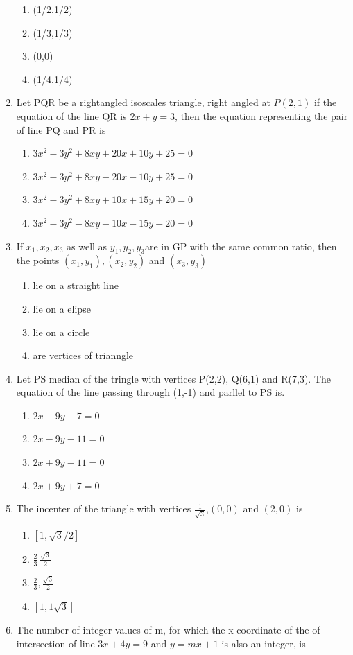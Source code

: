 \documentclass[12pt]{article}
\begin{document}
\begin{enumerate}
\begin{enumerate}
\item  (1/2,1/2) 
\item   (1/3,1/3) 
\item    (0,0)
\item   (1/4,1/4)
\end{enumerate}
\item Let PQR be a rightangled isoscales triangle, right angled at $P(2,1)$ if the equation of the line QR is $2x+y=3$, then the equation representing the pair of line PQ and PR is
\begin{enumerate}
\item $3x^2-3y^2+8xy+20x+10y+25=0$
\item   $3x^2-3y^2+8xy-20x-10y+25=0$
\item   $3x^2-3y^2+8xy+10x+15y+20=0$
\item  $3x^2-3y^2-8xy-10x-15y-20=0$
\end{enumerate}
\item If $x_1,x_2,x_3$ as well as $y_1,y_2,y_3 $are in GP with the same common ratio, then the points $(x_1,y_1),(x_2,y_2)$ and $(x_3,y_3)$
\begin{enumerate}
\item lie on a straight line 
\item lie on a elipse 
\item lie on a circle  
\item  are vertices of trianngle 
\end{enumerate}
\item Let PS median of the tringle with vertices P(2,2), Q(6,1) and R(7,3). The equation of the line passing through (1,-1) and parllel to PS is.
\begin{enumerate}
\item $2x-9y-7=0$ 
\item   $2x-9y-11=0$ 
\item $2x+9y-11=0$
\item $2x+9y+7=0$
\end{enumerate}
\item  The incenter of the triangle with vertices $\frac{1}{\sqrt{3}}$,$(0,0)$ and $(2,0)$ is
\begin{enumerate}
\item $[1,\sqrt{3}/2]$ 
\item $\frac{2}{3}\,\frac{\sqrt{3}}{2}$ 
\item  $\frac{2}{3},\frac{\sqrt{3}}{2}$ 
\item  $[1,{1}{\sqrt{3}}]$
\end{enumerate}
\item The number of integer values of m, for which the x-coordinate of the of intersection of line $3x+4y=9$ and $y=mx+1$ is also an integer, is

\end{enumerate}
\end{document}
